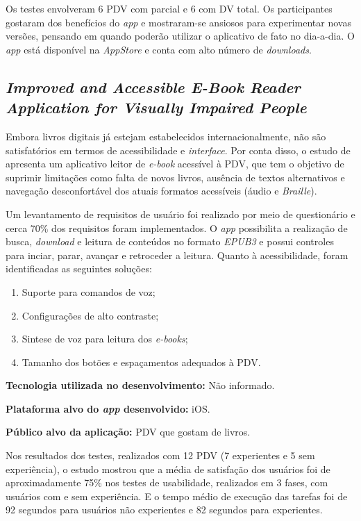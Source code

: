 Os testes envolveram 6 PDV com parcial e 6 com DV total.
Os participantes gostaram dos benefícios do \emph{app} e mostraram-se ansiosos para experimentar novas versões, pensando em quando poderão utilizar o aplicativo de fato no dia-a-dia.
O \emph{app} está disponível na \emph{AppStore} e conta com alto número de \emph{downloads}.

\subsection{\emph{Improved and Accessible E-Book Reader Application for Visually Impaired People}}

Embora livros digitais já estejam estabelecidos internacionalmente, não são satisfatórios em termos de acessibilidade e \emph{interface}.
Por conta disso, o estudo de  apresenta um aplicativo leitor de \emph{e-book} acessível à PDV, que tem o objetivo
de suprimir limitações como falta de novos livros, ausência de textos alternativos e navegação desconfortável dos atuais formatos
acessíveis (áudio e \emph{Braille}).

Um levantamento de requisitos de usuário foi realizado por meio de questionário e cerca 70\% dos requisitos foram implementados.
O \emph{app} possibilita a realização de busca, \emph{download} e leitura de conteúdos no formato \emph{EPUB3} e possui controles para inciar, parar, avançar e retroceder a leitura.
Quanto à acessibilidade, foram identificadas as seguintes soluções:

\begin{enumerate}
    \item Suporte para comandos de voz;
    \item Configurações de alto contraste;
    \item Sintese de voz para leitura dos \emph{e-books};
    \item Tamanho dos botões e espaçamentos adequados à PDV\@.
\end{enumerate}

\textbf{Tecnologia utilizada no desenvolvimento:} Não informado.

\textbf{Plataforma alvo do \emph{app} desenvolvido:} iOS.

\textbf{Público alvo da aplicação:} PDV que gostam de livros\@.

Nos resultados dos testes, realizados com 12 PDV (7 experientes e 5 sem experiência), o estudo mostrou que a média de satisfação
dos usuários foi de aproximadamente 75\% nos testes de usabilidade, realizados em 3 fases, com usuários com e sem experiência.
E o tempo médio de execução das tarefas foi de 92 segundos para usuários não experientes e 82 segundos para experientes.


